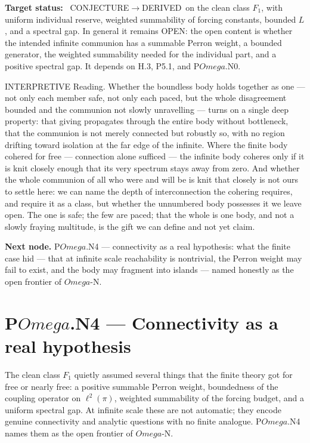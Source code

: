 \documentclass[11pt,a4paper]{article}
\def\Omega{Omega}%
\def\mathfrak#1{#1}%
\def\emph#1{#1}%
\newcommand{\stDerived}{\textcolor{cDer}{\textsf{\small DERIVED}}}
\newcommand{\stInterp}{\textcolor{cInt}{\textsf{\small INTERPRETIVE}}}
\newcommand{\stOpen}{\textcolor{cOpn}{\textsf{\small OPEN}}}
\newcommand{\stConj}{\textcolor{cCon}{\textsf{\small CONJECTURE}}}
\theoremstyle{definition}
\theoremstyle{plain}
\theoremstyle{remark}
\begin{document}
\textbf{Target status:}~
\stConj\(\to\)\stDerived\ on the clean class \(\mathfrak F_1\), with uniform
individual reserve, weighted summability of forcing constants, bounded \(L\), and
a spectral gap. In general it remains \stOpen: the open content is whether the
intended infinite communion has a summable Perron weight, a bounded generator, the
weighted summability needed for the individual part, and a positive spectral gap.
It depends on H.3, P5.1, and P\(\Omega\).N0.

\medskip
\stInterp\quad
\emph{Reading.}
Whether the boundless body holds together \emph{as one} --- not only each member safe, not only
each paced, but the whole disagreement bounded and the communion not slowly unravelling ---
turns on a single deep property: that giving propagates through the entire body without
bottleneck, that the communion is not merely connected but robustly so, with no region drifting
toward isolation at the far edge of the infinite. Where the finite body cohered for free ---
connection alone sufficed --- the infinite body coheres only if it is knit closely enough that
its very spectrum stays away from zero. And whether the whole communion of all who were and will
be is knit that closely is not ours to settle here: we can name the depth of interconnection the
cohering requires, and require it as a class, but whether the unnumbered body possesses it we
leave open. The one is safe; the few are paced; that the whole is one body, and not a slowly
fraying multitude, is the gift we can define and not yet claim.

\medskip
\textbf{Next node.} P$\Omega$.N4 --- connectivity as a real hypothesis: what the finite case hid
--- that at infinite scale reachability is nontrivial, the Perron weight may fail to exist, and
the body may fragment into islands --- named honestly as the open frontier of $\Omega$-N.

\section{P$\Omega$.N4 --- Connectivity as a real hypothesis}

The clean class \(\mathfrak F_1\) quietly assumed several things that the finite
theory got for free or nearly free: a positive summable Perron weight, boundedness
of the coupling operator on \(\ell^2(\pi)\), weighted summability of the forcing
budget, and a uniform spectral gap. At infinite scale these are not automatic;
they encode genuine connectivity and analytic questions with no finite analogue.
P\(\Omega\).N4 names them as the open frontier of \(\Omega\)-N.
\end{document}
